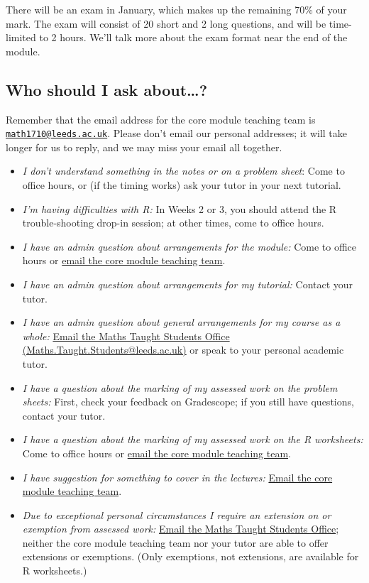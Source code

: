 \documentclass[
  a4paper,
]{book}
\providecommand{\tightlist}{%
  \setlength{\itemsep}{0pt}\setlength{\parskip}{0pt}}
\theoremstyle{definition}
\theoremstyle{definition}
\theoremstyle{definition}
\theoremstyle{definition}
\theoremstyle{remark}
\begin{document}
There will be an exam in January, which makes up the remaining 70\% of your mark. The exam will consist of 20 short and 2 long questions, and will be time-limited to 2 hours. We'll talk more about the exam format near the end of the module.

\hypertarget{ask}{%
\subsection*{Who should I ask about\ldots?}\label{ask}}

Remember that the email address for the core module teaching team is \href{mailto:math1710@leeds.ac.uk}{\nolinkurl{math1710@leeds.ac.uk}}. Please don't email our personal addresses; it will take longer for us to reply, and we may miss your email all together.

\begin{itemize}
\tightlist
\item
  \emph{I don't understand something in the notes or on a problem sheet}: Come to office hours, or (if the timing works) ask your tutor in your next tutorial.
\item
  \emph{I'm having difficulties with R:} In Weeks 2 or 3, you should attend the R trouble-shooting drop-in session; at other times, come to office hours.
\item
  \emph{I have an admin question about arrangements for the module:} Come to office hours or \href{mailto:math1710@leeds.ac.uk}{email the core module teaching team}.
\item
  \emph{I have an admin question about arrangements for my tutorial:} Contact your tutor.
\item
  \emph{I have an admin question about general arrangements for my course as a whole:} \href{mailto:Maths.Taught.Students@leeds.ac.uk}{Email the Maths Taught Students Office (Maths.Taught.Students@leeds.ac.uk)} or speak to your personal academic tutor.
\item
  \emph{I have a question about the marking of my assessed work on the problem sheets:} First, check your feedback on Gradescope; if you still have questions, contact your tutor.
\item
  \emph{I have a question about the marking of my assessed work on the R worksheets:} Come to office hours or \href{mailto:math1710@leeds.ac.uk}{email the core module teaching team}.
\item
  \emph{I have suggestion for something to cover in the lectures:} \href{mailto:math1710@leeds.ac.uk}{Email the core module teaching team}.
\item
  \emph{Due to exceptional personal circumstances I require an extension on or exemption from assessed work:} \href{mailto:Maths.Taught.Students@leeds.ac.uk}{Email the Maths Taught Students Office}; neither the core module teaching team nor your tutor are able to offer extensions or exemptions. (Only exemptions, not extensions, are available for R worksheets.)
\end{itemize}
\end{document}
